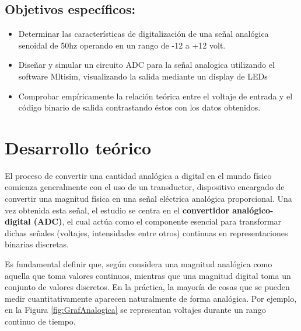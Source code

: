 \documentclass[12pt, a4paper]{article}
\begin{document}
    \subsection{Objetivos específicos:}
    \begin{itemize}
        \item Determinar las características de digitalización de una señal analógica senoidal de 50hz operando en un rango de -12 a +12 volt.
        \item Diseñar y simular un circuito ADC para la señal analogica utilizando el software Mltisim, visualizando la salida mediante un display de LEDs
        \item Comprobar empíricamente la relación teórica entre el voltaje de entrada y el código binario de salida contrastando éstos con los datos obtenidos. 
    \end{itemize}

    \newpage

    \section{Desarrollo teórico}

    El proceso de convertir una cantidad analógica a digital en el mundo físico comienza generalmente con el uso de un transductor, dispositivo encargado de convertir una magnitud física en una señal eléctrica analógica proporcional. Una vez obtenida esta señal, el estudio se centra en el \textbf{convertidor analógico-digital (ADC)}, el cual actúa como el componente esencial para transformar dichas señales (voltajes, intensidades entre otros) continuas en representaciones binarias discretas.
    
    Es fundamental definir que, según \cite{floyd2006fundamentos} considera una magnitud analógica como aquella que toma valores continuos, mientras que una magnitud digital toma un conjunto de valores discretos. En la práctica, la mayoría de cosas que se pueden medir cuantitativamente aparecen naturalmente de forma analógica. Por ejemplo, en la Figura \ref{fig:GrafAnalogica} se representan voltajes durante un rango continuo de tiempo.
\end{document}
